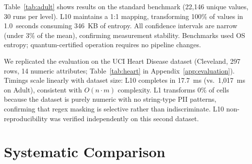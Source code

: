 \documentclass[acmsmall,screen,review,anonymous]{acmart}
\begin{document}
Table~\ref{tab:adult} shows results on the standard benchmark (22,146 unique values, 30 runs per level). L10 maintains a 1:1 mapping, transforming 100\% of values in 1.0~seconds consuming 346~KB of entropy. All confidence intervals are narrow (under 3\% of the mean), confirming measurement stability. Benchmarks used OS entropy; quantum-certified operation requires no pipeline changes.

We replicated the evaluation on the UCI Heart Disease dataset (Cleveland, 297 rows, 14 numeric attributes; Table~\ref{tab:heart} in Appendix~\ref{app:evaluation}). Timings scale linearly with dataset size: L10 completes in 17.7~ms (vs.\ 1,017~ms on Adult), consistent with $O(n \cdot m)$ complexity. L1 transforms 0\% of cells because the dataset is purely numeric with no string-type PII patterns, confirming that regex masking is selective rather than indiscriminate. L10 non-reproducibility was verified independently on this second dataset.

\section{Systematic Comparison}
\label{sec:comparison}
\end{document}
